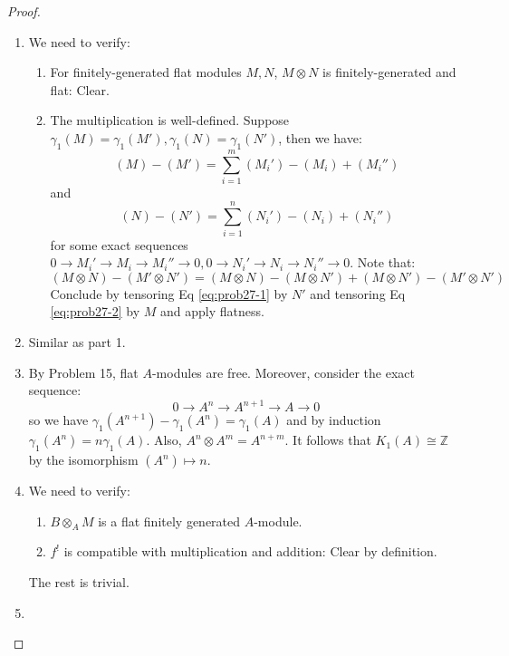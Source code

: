 \documentclass{solution}
\begin{document}
\begin{proof}
    \begin{enumerate}
        \item We need to verify:
        \begin{enumerate}
            \item For finitely-generated flat modules $M, N$, $M \otimes N$ is finitely-generated and flat: Clear.
            \item The multiplication is well-defined. Suppose $\gamma_1(M) = \gamma_1(M'), \gamma_1(N) = \gamma_1(N')$, then we have:
            \begin{equation} \label{eq:prob27-1}
                (M) - (M') = \sum\limits_{i = 1}^{m} (M_i') - (M_i) + (M_i'')
            \end{equation}
            and
            \begin{equation}\label{eq:prob27-2}
                (N) - (N') = \sum\limits_{i = 1}^{n} (N_i') - (N_i) + (N_i'')
            \end{equation}
            for some exact sequences $0 \rightarrow M_i' \rightarrow M_i \rightarrow M_i'' \rightarrow 0, 0 \rightarrow N_i' \rightarrow N_i \rightarrow N_i'' \rightarrow 0$. Note that:
            $$(M \otimes N) - (M' \otimes N') = (M \otimes N) - (M \otimes N') + (M \otimes N') - (M' \otimes N')$$
            Conclude by tensoring Eq \ref{eq:prob27-1} by $N'$ and tensoring Eq \ref{eq:prob27-2} by $M$ and apply flatness.
        \end{enumerate}
        \item Similar as part 1.
        \item By Problem 15, flat $A$-modules are free. Moreover, consider the exact sequence:
        $$0 \rightarrow A^n \rightarrow A^{n + 1} \rightarrow A \rightarrow 0$$
        so we have $\gamma_1(A^{n + 1}) - \gamma_1(A^n) = \gamma_1(A)$ and by induction $\gamma_1(A^{n}) = n \gamma_1(A)$. Also, $A^n \otimes A^m = A^{n + m}$. It follows that $K_1(A) \cong \mathbb{Z}$ by the isomorphism $(A^n) \mapsto n$.
        \item We need to verify:
        \begin{enumerate}
            \item $B \otimes_A M$ is a flat finitely generated $A$-module. \TODO
            \item $f^{!}$ is compatible with multiplication and addition: Clear by definition.
        \end{enumerate}
        The rest is trivial.
        \item \TODO
    \end{enumerate}
\end{proof}
\end{document}

